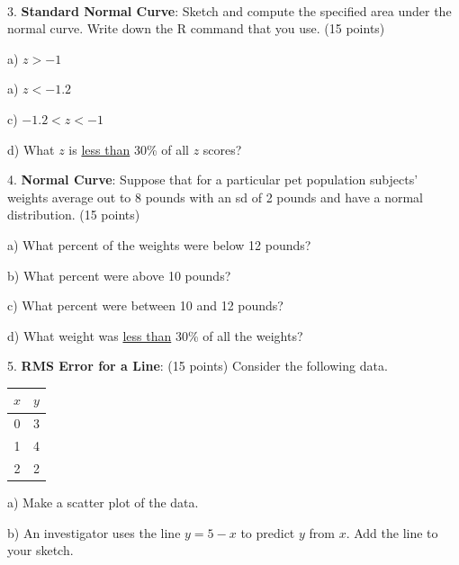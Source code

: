 \documentclass[10pt]{article}
\begin{document}
\eject
{\ }

3. \textbf{Standard Normal Curve}:  Sketch and compute the specified area under the normal curve. 
Write down the R command that you use. (15 points)

\hspace{10pt} a) $z > -1$
\vspace{.6in}

\hspace{10pt} a) $z < -1.2$
\vspace{.6in}

\hspace{10pt} c) $-1.2 < z < -1$
\vspace{.6in}

\hspace{10pt} d) What $z$ is \underline{less than} 30\% of all $z$ scores?
\vspace{1in}

4. \textbf{Normal Curve}:  Suppose that for a particular pet population
subjects' weights average out to 8 pounds with an sd of 2 pounds and have
a normal distribution. (15 points)

\hspace{10pt} a) What percent of the weights were below 12 pounds?
\vspace{1in}

\hspace{10pt} b) What percent were above 10 pounds?
\vspace{1in}

\hspace{10pt} c) What percent were between 10 and 12 pounds?
\vspace{1in}

\hspace{10pt} d) What weight was \underline{less than} 30\% of all the weights?
\vfill
\eject
{\ }

5. \textbf{RMS Error for a Line}: (15 points) Consider the following data.
\begin{tabular}{|c|c|}\hline
$x$ & $y$\\\hline
0   & 3\\
1   & 4\\
2   & 2\\\hline
\end{tabular}

\hspace{10pt} a) Make a scatter plot of the data.  
\vspace{2in}

\hspace{10pt} b) An investigator uses the line $y=5 - x$ to predict $y$ from $x$.
Add the line to your sketch.
\medskip
\end{document}
